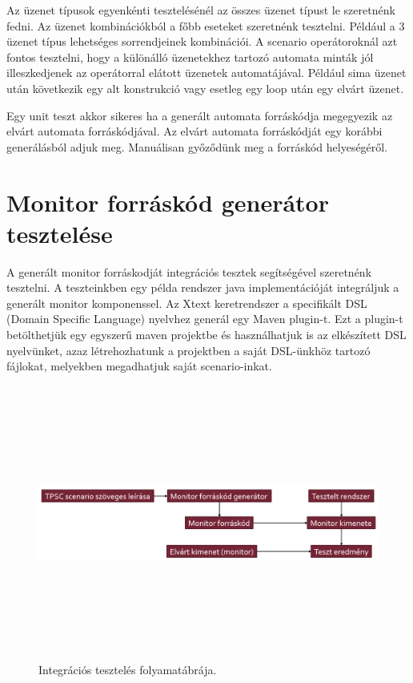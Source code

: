 Az üzenet típusok egyenkénti tesztelésénél az összes üzenet típust le szeretnénk fedni.
Az üzenet kombinációkból a főbb eseteket szeretnénk tesztelni.
Például a 3 üzenet típus lehetséges sorrendjeinek kombinációi.
A scenario operátoroknál azt fontos tesztelni, hogy a különálló üzenetekhez tartozó automata minták jól illeszkedjenek az operátorral elátott üzenetek automatájával.
Például sima üzenet után következik egy alt konstrukció vagy esetleg egy loop után egy elvárt üzenet.

Egy unit teszt akkor sikeres ha a generált automata forráskódja megegyezik az elvárt automata forráskódjával.
Az elvárt automata forráskódját egy korábbi generálásból adjuk meg.
Manuálisan győződünk meg a forráskód helyeségéről.

\clearpage\section{Monitor forráskód generátor tesztelése }

A generált monitor forráskodját integrációs tesztek segítségével szeretnénk tesztelni.
A teszteinkben egy példa rendszer java implementációját integráljuk a generált monitor komponenssel.
Az Xtext keretrendszer a specifikált DSL (Domain Specific Language) nyelvhez generál egy Maven plugin-t.
Ezt a plugin-t betölthetjük egy egyszerű maven projektbe és használhatjuk is az elkészített DSL nyelvünket, azaz létrehozhatunk a projektben a saját DSL-ünkhöz tartozó fájlokat, melyekben megadhatjuk saját scenario-inkat.

\begin{figure}[!ht]
    \centering
    \includegraphics[width=150mm, height=9cm, keepaspectratio]{figures/integration_test_flow.png}
    \caption{Integrációs tesztelés folyamatábrája.}
\end{figure}

